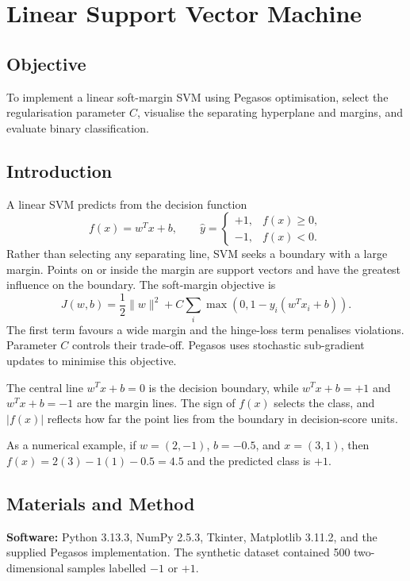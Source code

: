 \documentclass[12pt,a4paper]{report}
\newcommand{\experiment}[2]{
\chapter{#1}}
\begin{document}
\experiment{Linear Support Vector Machine}{04}

\section{Objective}
To implement a linear soft-margin SVM using Pegasos optimisation, select the regularisation parameter $C$, visualise the separating hyperplane and margins, and evaluate binary classification.

\section{Introduction}
A linear SVM predicts from the decision function
\begin{equation}
f(x)=w^Tx+b, \qquad \hat y=\begin{cases}+1,&f(x)\ge0,\\-1,&f(x)<0.\end{cases}
\end{equation}
Rather than selecting any separating line, SVM seeks a boundary with a large margin. Points on or inside the margin are support vectors and have the greatest influence on the boundary. The soft-margin objective is
\begin{equation}
J(w,b)=\frac12\lVert w\rVert^2+C\sum_i\max\left(0,1-y_i(w^Tx_i+b)\right).
\end{equation}
The first term favours a wide margin and the hinge-loss term penalises violations. Parameter $C$ controls their trade-off. Pegasos uses stochastic sub-gradient updates to minimise this objective.

The central line $w^Tx+b=0$ is the decision boundary, while $w^Tx+b=+1$ and $w^Tx+b=-1$ are the margin lines. The sign of $f(x)$ selects the class, and $|f(x)|$ reflects how far the point lies from the boundary in decision-score units.

As a numerical example, if $w=(2,-1)$, $b=-0.5$, and $x=(3,1)$, then $f(x)=2(3)-1(1)-0.5=4.5$ and the predicted class is $+1$.

\section{Materials and Method}
\textbf{Software:} Python 3.13.3, NumPy 2.5.3, Tkinter, Matplotlib 3.11.2, and the supplied Pegasos implementation. The synthetic dataset contained 500 two-dimensional samples labelled $-1$ or $+1$.
\end{document}
